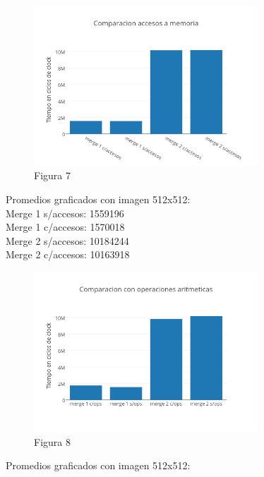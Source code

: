 \documentclass[a4paper]{article}
\begin{document}
\begin{figure}[h]
  \centering
    \includegraphics[width=0.75\textwidth]{imagenes/ComparacionAccesosAMemoriaMergeColores.png}
  \caption{Figura 7}
  \label{fig:graficomerge3}
\end{figure}
 \FloatBarrier
 
Promedios graficados con imagen 512x512:
\\

Merge 1 s/accesos: 1559196
\\

Merge 1 c/accesos: 1570018
\\

Merge 2 s/accesos: 10184244
\\

Merge 2 c/accesos: 10163918


\begin{figure}[h]
  \centering
    \includegraphics[width=0.75\textwidth]{imagenes/ComparacionConOperacionesAritmeticasMergeColores.png}
  \caption{Figura 8}
  \label{fig:graficomerge4}
\end{figure}
 \FloatBarrier

Promedios graficados con imagen 512x512:
\\
\end{document}
